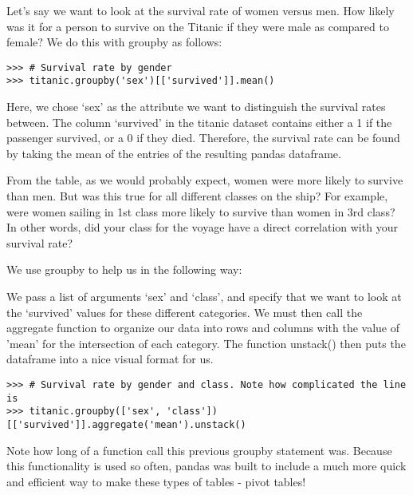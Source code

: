 Let's say we want to look at the survival rate of women versus men. How likely was it for a person to survive on the Titanic if they were male as compared to female? We do this with groupby as follows:

\begin{lstlisting}
>>> # Survival rate by gender
>>> titanic.groupby('sex')[['survived']].mean()
\end{lstlisting}


Here, we chose `sex' as the attribute we want to distinguish the survival rates between. The column `survived' in the titanic dataset contains either a 1 if the passenger survived, or a 0 if they died. Therefore, the survival rate can be found by taking the mean of the entries of the resulting pandas dataframe.

From the table, as we would probably expect, women were more likely to survive than men. But was this true for all different classes on the ship? For example, were women sailing in 1st class more likely to survive than women in 3rd class? In other words, did your class for the voyage have a direct correlation with your survival rate?

We use groupby to help us in the following way:

We pass a list of arguments `sex' and `class', and specify that we want to look at the `survived' values for these different categories. We must then call the aggregate function to organize our data into rows and columns with the value of 'mean' for the intersection of each category. The function unstack() then puts the dataframe into a nice visual format for us.

\begin{lstlisting}
>>> # Survival rate by gender and class. Note how complicated the line is
>>> titanic.groupby(['sex', 'class'])[['survived']].aggregate('mean').unstack()
\end{lstlisting}


Note how long of a function call this previous groupby statement was. Because this functionality is used so often, pandas was built to include a much more quick and efficient way to make these types of tables - pivot tables!

